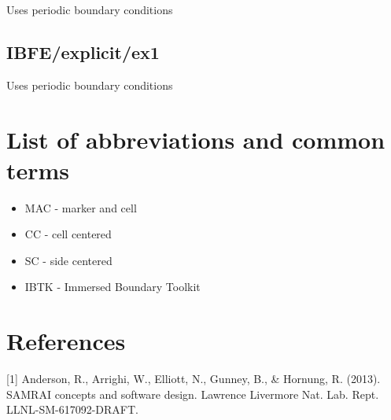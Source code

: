 \documentclass[12pt,a4paper,twoside]{article}
\begin{document}
Uses periodic boundary conditions

\subsection{IBFE/explicit/ex1}

Uses periodic boundary conditions


\section{List of abbreviations and common terms}
\begin{itemize}
    \item MAC - marker and cell
    \item CC - cell centered
    \item SC - side centered
    \item IBTK - Immersed Boundary Toolkit
\end{itemize}


\section*{References}
[1] Anderson, R., Arrighi, W., Elliott, N., Gunney, B., \& Hornung, R. (2013). SAMRAI concepts and software design. Lawrence Livermore Nat. Lab. Rept. LLNL-SM-617092-DRAFT.
\end{document}
